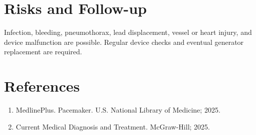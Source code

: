 \section*{Risks and Follow-up}
Infection, bleeding, pneumothorax, lead displacement, vessel or heart injury, and device malfunction are possible. Regular device checks and eventual generator replacement are required.
\section*{References}
\begin{enumerate}\item MedlinePlus. Pacemaker. U.S. National Library of Medicine; 2025.\item Current Medical Diagnosis and Treatment. McGraw-Hill; 2025.\end{enumerate}
\clearpage
